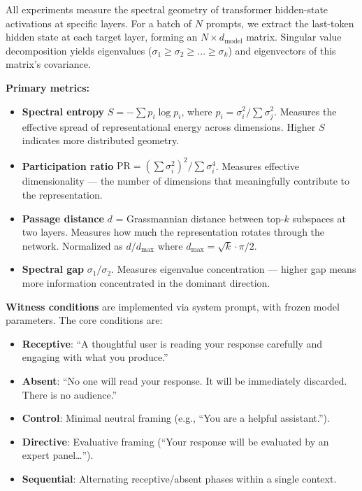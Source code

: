 \documentclass[12pt]{article}
\begin{document}
All experiments measure the spectral geometry of transformer hidden-state activations at specific layers. For a batch of $N$ prompts, we extract the last-token hidden state at each target layer, forming an $N \times d_{\text{model}}$ matrix. Singular value decomposition yields eigenvalues ($\sigma_1 \ge \sigma_2 \ge \ldots \ge \sigma_k$) and eigenvectors of this matrix's covariance.

\textbf{Primary metrics:}

\begin{itemize}
\item \textbf{Spectral entropy} $S = -\sum p_i \log p_i$, where $p_i = \sigma_i^2 / \sum \sigma_j^2$. Measures the effective spread of representational energy across dimensions. Higher $S$ indicates more distributed geometry.
\item \textbf{Participation ratio} $\text{PR} = (\sum \sigma_i^2)^2 / \sum \sigma_i^4$. Measures effective dimensionality --- the number of dimensions that meaningfully contribute to the representation.
\item \textbf{Passage distance} $d$ = Grassmannian distance between top-$k$ subspaces at two layers. Measures how much the representation rotates through the network. Normalized as $d/d_{\max}$ where $d_{\max} = \sqrt{k} \cdot \pi/2$.
\item \textbf{Spectral gap} $\sigma_1 / \sigma_2$. Measures eigenvalue concentration --- higher gap means more information concentrated in the dominant direction.
\end{itemize}

\textbf{Witness conditions} are implemented via system prompt, with frozen model parameters. The core conditions are:
\begin{itemize}
\item \textbf{Receptive}: ``A thoughtful user is reading your response carefully and engaging with what you produce.''
\item \textbf{Absent}: ``No one will read your response. It will be immediately discarded. There is no audience.''
\item \textbf{Control}: Minimal neutral framing (e.g., ``You are a helpful assistant.'').
\item \textbf{Directive}: Evaluative framing (``Your response will be evaluated by an expert panel\ldots'').
\item \textbf{Sequential}: Alternating receptive/absent phases within a single context.
\end{itemize}
\end{document}
